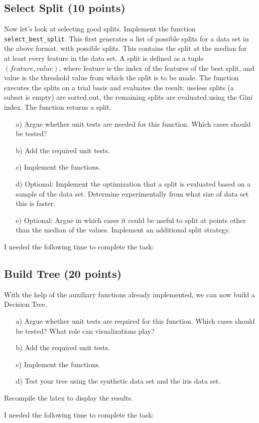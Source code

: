 \subsection{Select Split (10 points)}

Now let's look at selecting good splits. Implement the function \texttt{select\_best\_split}. This first generates a list of possible splits for a data set in the above format.
with possible splits. This contains the split at the median for at least every feature in the data set. A split is defined as a tuple $( feature, value )$, where feature is the index of the
features of the best split, and value is the threshold value from which the split is to be made. The function executes the splits on a trial basis and evaluates the result: useless splits
(a subset is empty) are sorted out, the remaining splits are evaluated using the Gini index. The function returns a split. 

\begin{enumerate}

\item[a)] Argue whether unit tests are needed for this function. Which cases should be tested?

\item[b)] Add the required unit tests.

\item[c)] Implement the functions.

\item[d)] Optional: Implement the optimization that a split is evaluated based on a sample of the data set. Determine experimentally from what size of data set this is faster.

\item[e)] Optional: Argue in which cases it could be useful to split at points other than the median of the values. Implement an additional split strategy.

\end{enumerate}

I needed the following time to complete the task:

\subsection{Build Tree (20 points)}

With the help of the auxiliary functions already implemented, we can now build a Decision Tree. 

\begin{enumerate}

\item[a)] Argue whether unit tests are required for this function. Which cases should be tested? What role can visualizations play? 

\item[b)] Add the required unit tests.

\item[c)] Implement the functions.

\item[d)] Test your tree using the synthetic data set and the iris data set.

\end{enumerate}

Recompile the latex to display the results.

I needed the following time to complete the task:


